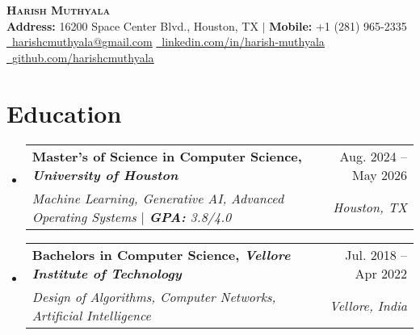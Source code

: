 \documentclass[letterpaper,11pt]{article}
\makeatletter
\newcommand{\resumeSubheading}[4]{
  \vspace{-2pt}\item
    \begin{tabular*}{0.97\textwidth}[t]{l@{\extracolsep{\fill}}r}
      \textbf{#1} & #2 \\
      \textit{\small#3} & \textit{\small #4} \\
    \end{tabular*}\vspace{-7pt}
}
\newcommand{\resumeSubHeadingListStart}{\begin{itemize}[leftmargin=0.15in, label={}]}
\newcommand{\resumeSubHeadingListEnd}{\end{itemize}}
\makeatother
\begin{document}

\begin{center}
    \textbf{\Huge \scshape Harish Muthyala} \\
    {\small
        \vspace{6pt}
        \textbf{Address:} 16200 Space Center Blvd., Houston, TX $|$ \textbf{Mobile:} +1 (281) 965-2335 \\
        \vspace{3pt}
        \href{mailto:harishcmuthyala@gmail.com}{\faEnvelope~\underline{harishcmuthyala@gmail.com}} \hspace{1em}
        \href{https://linkedin.com/in/harish-muthyala}{\faLinkedinSquare~\underline{linkedin.com/in/harish-muthyala}} \hspace{1em}
        \href{https://github.com/harishcmuthyala}{\faGithub~\underline{github.com/harishcmuthyala}}
    }
\end{center}





\section{Education}
\resumeSubHeadingListStart
  \resumeSubheading
    {Master's of Science in Computer Science, \textmd{\textit{University of Houston}}}{Aug. 2024 -- May 2026}
    {Machine Learning, Generative AI, Advanced Operating Systems $|$ \textbf{GPA: }3.8/4.0}{Houston, TX}

  \resumeSubheading
    {Bachelors in Computer Science, \textmd{\textit{Vellore Institute of Technology}}}{Jul. 2018 -- Apr 2022}
    {Design of Algorithms, Computer Networks, Artificial Intelligence}{Vellore, India}
\resumeSubHeadingListEnd


%
\end{document}
